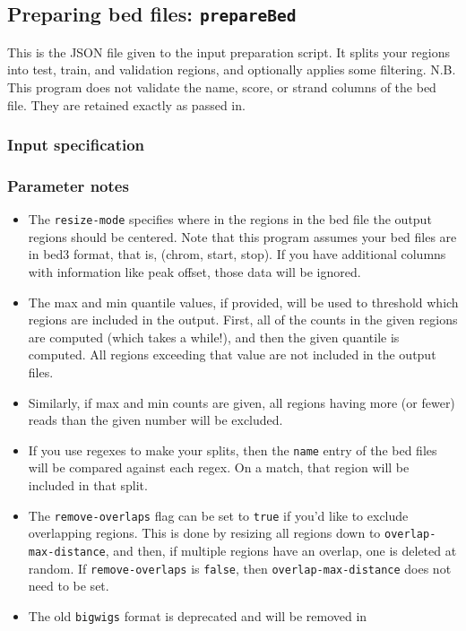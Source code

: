 \documentclass{article}
\begin{document}
\newpage

\subsection{Preparing bed files: \texttt{prepareBed}}\label{prog:prepareBed}

This is the JSON file given to the input preparation script.
It splits your regions into test, train, and validation regions, and optionally
applies some filtering.
N.B. This program does not validate the name, score, or strand columns of the
bed file.
They are retained exactly as passed in.

\subsubsection{Input specification}



\subsubsection{Parameter notes}

\begin{itemize}
    \item The \texttt{resize-mode} specifies where in the regions in the bed
        file the output regions should be centered.
        Note that this program assumes your bed files are in bed3 format, that
        is, (chrom, start, stop).
        If you have additional columns with information like peak offset, those
        data will be ignored.
    \item The max and min quantile values, if provided, will be used to
        threshold which regions are included in the output.
        First, all of the counts in the given regions are computed (which takes
        a while!), and then the given quantile is computed.
        All regions exceeding that value are not included in the output files.
    \item Similarly, if max and min counts are given, all regions having more
        (or fewer) reads than the given number will be excluded.
    \item If you use regexes to make your splits, then the \texttt{name} entry
        of the bed files will be compared against each regex.
        On a match, that region will be included in that split.
    \item The \texttt{remove-overlaps} flag can be set to \texttt{true} if you'd
        like to exclude overlapping regions.
        This is done by resizing all regions down to
        \texttt{overlap-max-distance}, and then, if multiple regions have an
        overlap, one is deleted at random.
        If \texttt{remove-overlaps} is \texttt{false}, then
        \texttt{overlap-max-distance} does not need to be set.
    \item The old \texttt{bigwigs} format is deprecated and will be removed
        in \label{dep:oldbigwigs}
\end{itemize}
\end{document}
